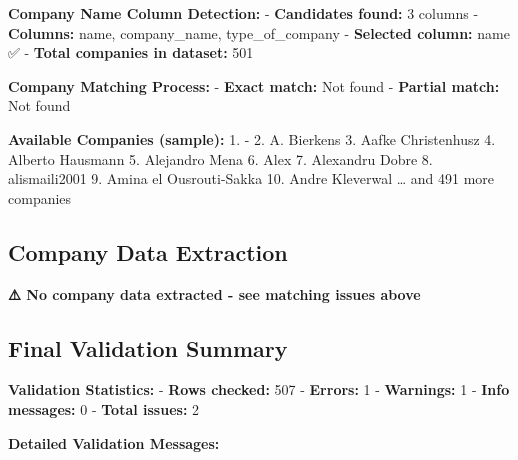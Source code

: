 \documentclass[
  oneside,
  open=any,
  fontsize=11pt]{article}
\begin{document}
\textbf{Company Name Column Detection:} - \textbf{Candidates found:} 3
columns - \textbf{Columns:} name, company\_name, type\_of\_company -
\textbf{Selected column:} name ✅ - \textbf{Total companies in dataset:}
501

\textbf{Company Matching Process:} - \textbf{Exact match:} Not found -
\textbf{Partial match:} Not found

\textbf{Available Companies (sample):} 1. - 2. A. Bierkens 3. Aafke
Christenhusz 4. Alberto Hausmann 5. Alejandro Mena 6. Alex 7. Alexandru
Dobre 8. alismaili2001 9. Amina el Ousrouti-Sakka 10. Andre Kleverwal
\ldots{} and 491 more companies

\subsection{Company Data Extraction}\label{company-data-extraction}

\textbf{⚠️ No company data extracted - see matching issues above}

\subsection{Final Validation Summary}\label{final-validation-summary}

\textbf{Validation Statistics:} - \textbf{Rows checked:} 507 -
\textbf{Errors:} 1 - \textbf{Warnings:} 1 - \textbf{Info messages:} 0 -
\textbf{Total issues:} 2

\textbf{Detailed Validation Messages:}
\end{document}
